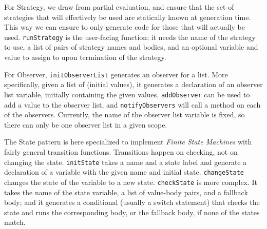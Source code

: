 \documentclass[sigplan,review,prologue,dvipsnames]{acmart}
\begin{document}
For Strategy, we draw from partial evaluation, and ensure that the set of
strategies that will effectively be used are statically known at generation
time.  This way we can ensure to only generate code for those that will
actually be used.  \verb|runStrategy| is the user-facing function; it needs the
name of the strategy to use, a list of pairs of strategy names and bodies, and
an optional variable and value to assign to upon termination of the strategy.

For Observer, \verb|initObserverList| generates an observer for a list.  More
specifically, given a list of (initial values), it generates a declaration of
an observer list variable, initially containing the given values.
\verb|addObserver| can be used to add a value to the observer list, and
\verb|notifyObservers| will call a method on each of the observers. Currently,
the name of the observer list variable is fixed, so there can only be one
observer list in a given scope.

The State pattern is here specialized to implement \emph{Finite State Machines}
with fairly general transition functions.  Transitions happen on checking, not
on changing the state.  \verb|initState| takes a name and a state label and
generate a declaration of a variable with the given name and initial state.
\verb|changeState| changes the state of the variable to a new state.
\verb|checkState| is more complex.  It takes the name of the state variable, a
list of value-body pairs, and a fallback body; and it generates a conditional
(usually a switch statement) that checks the state and runs the corresponding
body, or the fallback body, if none of the states match.
\end{document}
